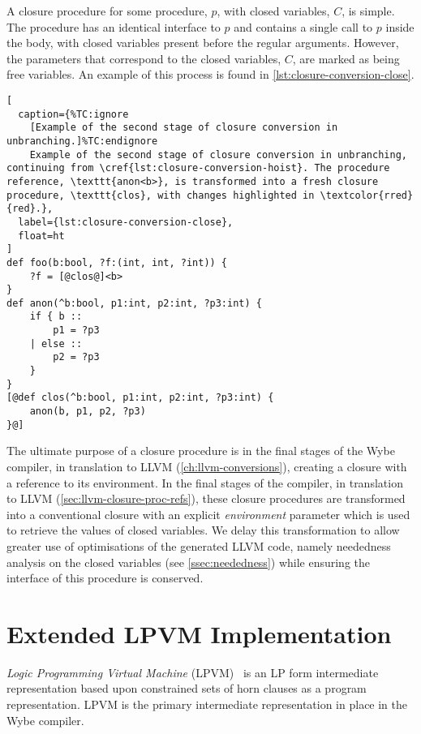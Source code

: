 A closure procedure for some procedure, $p$, with closed variables, $C$, is simple. The procedure has an identical interface to $p$ and contains a single call to $p$ inside the body, with closed variables present before the regular arguments. However, the parameters that correspond to the closed variables, $C$, are marked as being free variables. An example of this process is found in \cref{lst:closure-conversion-close}.

\begin{lstlisting}[
  caption={%TC:ignore
    [Example of the second stage of closure conversion in unbranching.]%TC:endignore
    Example of the second stage of closure conversion in unbranching, continuing from \cref{lst:closure-conversion-hoist}. The procedure reference, \texttt{anon<b>}, is transformed into a fresh closure procedure, \texttt{clos}, with changes highlighted in \textcolor{rred}{red}.},
  label={lst:closure-conversion-close},
  float=ht
]
def foo(b:bool, ?f:(int, int, ?int)) {
    ?f = [@clos@]<b>
}
def anon(^b:bool, p1:int, p2:int, ?p3:int) {
    if { b :: 
        p1 = ?p3 
    | else :: 
        p2 = ?p3
    } 
}
[@def clos(^b:bool, p1:int, p2:int, ?p3:int) {
    anon(b, p1, p2, ?p3)
}@]
\end{lstlisting}

The ultimate purpose of a closure procedure is in the final stages of the Wybe compiler, in translation to LLVM (\cref{ch:llvm-conversions}), creating a closure with a reference to its environment. In the final stages of the compiler, in translation to LLVM (\cref{sec:llvm-closure-proc-refs}), these closure procedures are transformed into a conventional closure with an explicit \textit{environment} parameter which is used to retrieve the values of closed variables. We delay this transformation to allow greater use of optimisations of the generated LLVM code, namely neededness analysis on the closed variables (see \cref{ssec:neededness}) while ensuring the interface of this procedure is conserved.

\section{Extended LPVM Implementation}
\label{sec:extended-lpvm}

\textit{Logic Programming Virtual Machine} (LPVM)~\cite{gange2015horn} is an LP form intermediate representation based upon constrained sets of horn clauses as a program representation. LPVM is the primary intermediate representation in place in the Wybe compiler. 

